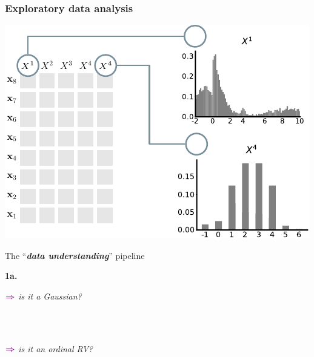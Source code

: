 \documentclass[xcolor={usenames,dvipsnames,svgnames}, compress, aspectratio=169, 11pt]{beamer}
\newcommand{\comment}[3][\small]{\begin{minipage}{1\linewidth}
          \raggedleft
          {
            $\color{violet}\boldsymbol\Rightarrow$
            #1
            {\emph{#2}}
          }
      \end{minipage}#3\\
}
\begin{document}
\begin{frame}[t, htt=bgrey2]
  \frametitle{Exploratory data analysis}

  \large
  \begin{minipage}[t]{0.6\linewidth}
    \vspace{5pt}
    \includegraphics[width=.9\linewidth]{figures/abda-hist-type}
  \end{minipage}\hfill\begin{minipage}[t]{0.4\linewidth}
    \vspace{10pt}
    {The ``\emph{\textbf{data understanding}}'' pipeline}\\[3pt]
    \raggedleft\begin{minipage}[t]{.9\linewidth}
      {\textbf{1a.} \\[5pt]}
    {\comment[\normalsize]{is it a Gaussian?}{}\\[-17pt]
      \comment[\normalsize]{is it an ordinal RV?}{}\\}
    \end{minipage}    
  \end{minipage}  
\end{frame}

\end{document}
